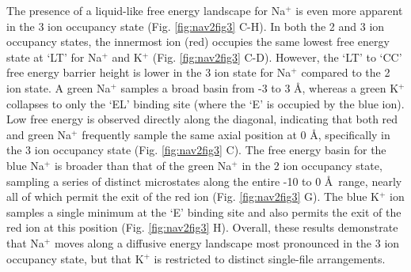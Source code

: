 \begin{refsection}
The presence of a liquid-like free energy landscape for Na$^+$ is even more apparent in the 3 ion occupancy state (Fig. \ref{fig:nav2fig3} C-H). In both the 2 and 3 ion occupancy states, the innermost ion (red) occupies the same lowest free energy state at `LT' for Na$^+$ and K$^+$ (Fig. \ref{fig:nav2fig3} C-D). However, the `LT' to `CC' free energy barrier height is lower in the 3 ion state for Na$^+$ compared to the 2 ion state. A green Na$^+$ samples a broad basin from -3 to 3 \AA, whereas a green K$^+$ collapses to only the `EL' binding site (where the `E' is occupied by the blue ion). Low free energy is observed directly along the diagonal, indicating that both red and green Na$^+$ frequently sample the same axial position at 0 \AA, specifically in the 3 ion occupancy state (Fig. \ref{fig:nav2fig3} C). The free energy basin for the blue Na$^+$ is broader than that of the green Na$^+$ in the 2 ion occupancy state, sampling a series of distinct microstates along the entire -10 to 0 \AA \, range, nearly all of which permit the exit of the red ion (Fig. \ref{fig:nav2fig3} G). The blue K$^+$ ion samples a single minimum at the `E' binding site and also permits the exit of the red ion at this position (Fig. \ref{fig:nav2fig3} H). Overall, these results demonstrate that Na$^+$ moves along a diffusive energy landscape most pronounced in the 3 ion occupancy state, but that K$^+$ is restricted to distinct single-file arrangements.


\end{refsection}
